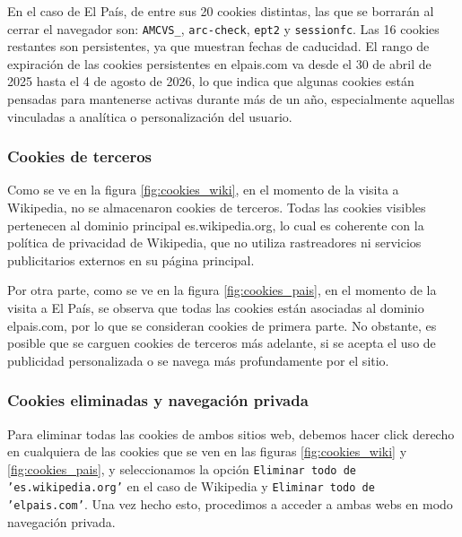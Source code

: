 En el caso de El País, de entre sus 20 cookies distintas, las que se borrarán al cerrar el navegador son: \texttt{AMCVS\_}, \texttt{arc-check}, \texttt{ept2} y \texttt{sessionfc}. Las 16 cookies restantes son persistentes, ya que muestran fechas de caducidad. El rango de expiración de las cookies persistentes en elpais.com va desde el 30 de abril de 2025 hasta el 4 de agosto de 2026, lo que indica que algunas cookies están pensadas para mantenerse activas durante más de un año, especialmente aquellas vinculadas a analítica o personalización del usuario. 

\subsubsection{Cookies de terceros}

Como se ve en la figura \ref{fig:cookies_wiki}, en el momento de la visita a Wikipedia, no se almacenaron cookies de terceros. Todas las cookies visibles pertenecen al dominio principal es.wikipedia.org, lo cual es coherente con la política de privacidad de Wikipedia, que no utiliza rastreadores ni servicios publicitarios externos en su página principal. 

Por otra parte, como se ve en la figura \ref{fig:cookies_pais}, en el momento de la visita a El País, se observa que todas las cookies están asociadas al dominio elpais.com, por lo que se consideran cookies de primera parte. No obstante, es posible que se carguen cookies de terceros más adelante, si se acepta el uso de publicidad personalizada o se navega más profundamente por el sitio.

\subsubsection{Cookies eliminadas y navegación privada}

Para eliminar todas las cookies de ambos sitios web, debemos hacer click derecho en cualquiera de las cookies que se ven en las figuras \ref{fig:cookies_wiki} y \ref{fig:cookies_pais}, y seleccionamos la opción \texttt{Eliminar todo de 'es.wikipedia.org'} en el caso de Wikipedia y \texttt{Eliminar todo de 'elpais.com'}. Una vez hecho esto, procedimos a acceder a ambas webs en modo navegación privada. 

